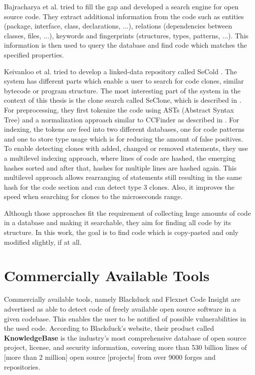 Bajracharya et al. tried to fill the gap and developed a search engine for open source code.
They extract additional information from the code such as entities (package, interface, class, declarations, ...), relations (dependencies between classes, files, ...), keywords and fingerprints (structures, types, patterns, ...).
This information is then used to query the database and find code which matches the specified properties.

Keivanloo et al. tried to develop a linked-data repository called SeCold \cite{keivanloo2012leveraging,keivanloo2011internet,keivanloo2011seclone,keivanloo2010semantic}.
The system has different parts which enable a user to search for code clones, similar bytecode or program structure.
The most interesting part of the system in the context of this thesis is the clone search called SeClone, which is described in \cite{keivanloo2011internet,keivanloo2011seclone}.
For preprocessing, they first tokenize the code using ASTs (Abstract Syntax Tree) and a normalization approach similar to CCFinder as described in \cite{kamiya2002ccfinder}.
For indexing, the tokens are feed into two different databases, one for code patterns and one to store type usage which is for reducing the amount of false positives.
To enable detecting clones with added, changed or removed statements, they use a multilevel indexing approach, where lines of code are hashed, the emerging hashes sorted and after that, hashes for multiple lines are hashed again.
This multilevel approach allows rearranging of statements still resulting in the same hash for the code section and can detect type 3 clones.
Also, it improves the speed when searching for clones to the microseconds range.

Although those approaches fit the requirement of collecting huge amounts of code in a database and making it searchable, they aim for finding all code by its structure.
In this work, the goal is to find code which is copy-pasted and only modified slightly, if at all.

\section{Commercially Available Tools}
Commercially available tools, namely Blackduck and Flexnet Code Insight are advertised as able to detect code of freely available open source software in a given codebase.
This enables the user to be notified of possible vulnerabilities in the used code.
According to Blackduck's website, their product called \textbf{KnowledgeBase} \glqq is the industry’s most comprehensive database of open source project, license, and security information, covering more than 530 billion lines of [more than 2 million] open source [projects] from over 9000 forges and repositories\grqq \cite{blackduck}.

